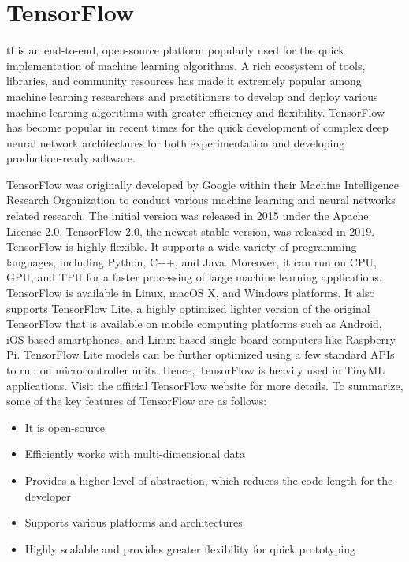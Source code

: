 \section{TensorFlow}
\label{TensorFlow}

\ac{tf} is an end-to-end, open-source platform popularly used for the quick implementation of machine learning algorithms. A rich ecosystem of tools, libraries, and community resources has made it extremely popular among machine learning researchers and practitioners to develop and deploy various machine learning algorithms with greater efficiency and flexibility. TensorFlow has become popular in recent times for the quick development of complex deep neural network architectures for both experimentation and developing production-ready software.\cite{TensorFlow:2023}

TensorFlow was originally developed by Google within their Machine Intelligence Research Organization to conduct various machine learning and neural networks related research. The initial version was released in 2015 under the Apache License 2.0. TensorFlow 2.0, the newest stable version, was released in 2019. TensorFlow is highly flexible. It supports a wide variety of programming languages, including Python, C++, and Java. Moreover, it can run on CPU, GPU, and TPU for a faster processing of large machine learning applications. TensorFlow is available in Linux, macOS X, and Windows platforms. It also supports TensorFlow Lite, a highly optimized lighter version of the original TensorFlow that is available on mobile computing platforms such as Android, iOS-based smartphones, and Linux-based single board computers like Raspberry Pi. TensorFlow Lite models can be further optimized using a few standard APIs to run on microcontroller units. Hence, TensorFlow is heavily used in TinyML applications. Visit the official TensorFlow website for more details. To summarize, some of the key features of TensorFlow are as follows:

\begin{itemize}
	
	\item It is open-source 
	
	\item Efficiently works with multi-dimensional data
	
	\item Provides a higher level of abstraction, which reduces the code length for the developer 
	
	\item Supports various platforms and architectures
	
	\item Highly scalable and provides greater flexibility for quick prototyping 
	
\end{itemize}

